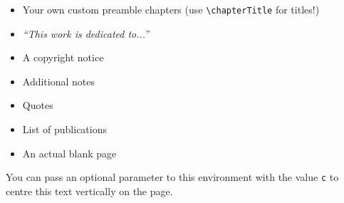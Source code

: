\begin{toc}
	\begin{itemize}
		\item Your own custom preamble chapters (use \texttt{\textbackslash chapterTitle} for titles!)
		\item \emph{``This work is dedicated to...''}
		\item A copyright notice
		\item Additional notes
		\item Quotes
		\item List of publications
		\item An actual blank page
	\end{itemize}
	You can pass an optional parameter to this environment with the value \texttt{c} to centre this text vertically on the page.
\end{toc}